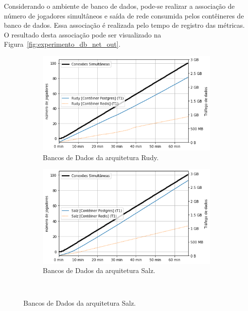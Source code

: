 Considerando o ambiente de banco de dados, pode-se realizar a associação de número de jogadores simultâneos e saída de rede consumida pelos contêineres de banco de dados.
%
Essa associação é realizada pelo tempo de registro das métricas.
%
O resultado desta associação pode ser visualizado na Figura~\ref{fig:experimento_db_net_out}.
\pagebreak
\begin{figure}[htb!]
    \caption{Saída de dados da rede dos bancos de dados.}
    \label{fig:experimento_db_net_out}

    \begin{subfigure}{0.5\textwidth}
        \centering
        \includegraphics[width=.95\linewidth]{figuras/analise/rt/r_net_out_db.png}
        \caption{Bancos de Dados da arquitetura Rudy.}
        \label{fig:r_netout_db}
    \end{subfigure}%
    \begin{subfigure}{0.5\textwidth}
        \centering
        \includegraphics[width=.95\linewidth]{figuras/analise/rt/s_net_out_db.png}
        \caption{Bancos de Dados da arquitetura Salz.}
        \label{fig:s_netout_db}
    \end{subfigure}\\


\end{figure}
